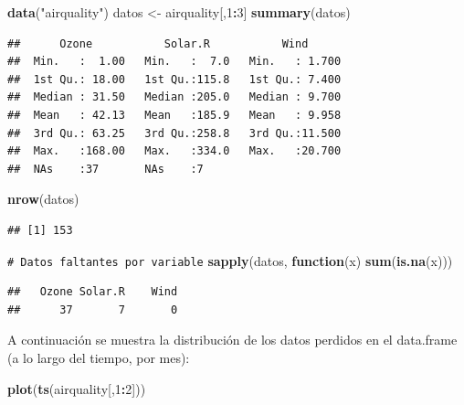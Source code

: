 \documentclass[
]{book}
\newenvironment{Shaded}{\begin{snugshade}}{\end{snugshade}}
\newcommand{\CommentTok}[1]{\textcolor[rgb]{0.56,0.35,0.01}{\textit{#1}}}
\newcommand{\ControlFlowTok}[1]{\textcolor[rgb]{0.13,0.29,0.53}{\textbf{#1}}}
\newcommand{\DecValTok}[1]{\textcolor[rgb]{0.00,0.00,0.81}{#1}}
\newcommand{\FunctionTok}[1]{\textcolor[rgb]{0.13,0.29,0.53}{\textbf{#1}}}
\newcommand{\NormalTok}[1]{#1}
\newcommand{\OtherTok}[1]{\textcolor[rgb]{0.56,0.35,0.01}{#1}}
\newcommand{\SpecialCharTok}[1]{\textcolor[rgb]{0.81,0.36,0.00}{\textbf{#1}}}
\newcommand{\StringTok}[1]{\textcolor[rgb]{0.31,0.60,0.02}{#1}}
\theoremstyle{break}
\theoremstyle{nonumberplain}
\renewcommand{\CommentTok}[1]{\textcolor[rgb]{0.41,0.41,0.41}{\texttt{#1}}}
\begin{document}
\begin{Shaded}
\begin{Highlighting}[]
\FunctionTok{data}\NormalTok{(}\StringTok{"airquality"}\NormalTok{)}
\NormalTok{datos }\OtherTok{\textless{}{-}}\NormalTok{ airquality[,}\DecValTok{1}\SpecialCharTok{:}\DecValTok{3}\NormalTok{]}
\FunctionTok{summary}\NormalTok{(datos)}
\end{Highlighting}
\end{Shaded}

\begin{verbatim}
##      Ozone           Solar.R           Wind       
##  Min.   :  1.00   Min.   :  7.0   Min.   : 1.700  
##  1st Qu.: 18.00   1st Qu.:115.8   1st Qu.: 7.400  
##  Median : 31.50   Median :205.0   Median : 9.700  
##  Mean   : 42.13   Mean   :185.9   Mean   : 9.958  
##  3rd Qu.: 63.25   3rd Qu.:258.8   3rd Qu.:11.500  
##  Max.   :168.00   Max.   :334.0   Max.   :20.700  
##  NAs    :37       NAs    :7
\end{verbatim}

\begin{Shaded}
\begin{Highlighting}[]
\FunctionTok{nrow}\NormalTok{(datos)}
\end{Highlighting}
\end{Shaded}

\begin{verbatim}
## [1] 153
\end{verbatim}

\begin{Shaded}
\begin{Highlighting}[]
\CommentTok{\# Datos faltantes por variable}
\FunctionTok{sapply}\NormalTok{(datos, }\ControlFlowTok{function}\NormalTok{(x) }\FunctionTok{sum}\NormalTok{(}\FunctionTok{is.na}\NormalTok{(x)))}
\end{Highlighting}
\end{Shaded}

\begin{verbatim}
##   Ozone Solar.R    Wind 
##      37       7       0
\end{verbatim}

A continuación se muestra la distribución de los datos perdidos en el data.frame (a lo largo del tiempo, por mes):

\begin{Shaded}
\begin{Highlighting}[]
\FunctionTok{plot}\NormalTok{(}\FunctionTok{ts}\NormalTok{(airquality[,}\DecValTok{1}\SpecialCharTok{:}\DecValTok{2}\NormalTok{]))}
\end{Highlighting}
\end{Shaded}
\end{document}
